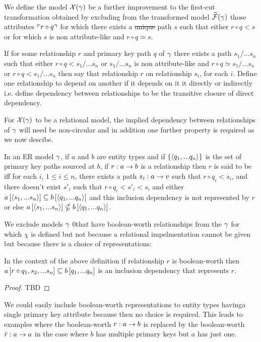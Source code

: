 We define the model $\mathcal{X}(\gamma)$  \index[definitions]{$\chi$}  be a further improvement to the first-cut transformation obtained by excluding  from  the transformed model $\mathcal{\widetilde{F}}(\gamma)$ those attributes $\left\ulcorner r \circ q\right\urcorner$ for which there exists a \sout{unique}  path $s$ such that  either  $r \circ q < s$ or for which $s$ is non attribute-like and $r \circ q \simeq s$. 

\begin{definition}
If for some relationship $r$ and primary key path $q$ of $\gamma$ there exists a  path $s_1/...s_n$ such that either   $r \circ q < s_1/...s_n$ or $s_1/...s_n$ is non attribute-like and $r \circ q \simeq s_1/...s_n$ or $r \circ q < s_1/...s_n$ then say that relationship $r$  on relationship $s_i$,
for each $i$. Define one relationship to depend on another if it depends on it it directly or indirectly i.e. define dependency between relationships to be the transitive closure of direct dependency.
\end{definition}

For $\mathcal{X}(\gamma)$ to be a relational model, the implied dependency between relationships of $\gamma$ will need be non-circular
and in addition one further property is required as we now descibe.


\begin{definition}
In an  ER model $\gamma$, if $a$ and $b$ are entity types and if $\left\{\langle q_1,...q_n\rangle\right\}$ is the set of primary key paths sourced at $b$, if $r: a \rightarrow b$ is a relationship then $r$ is said to be  
iff for each $i$, $1 \leq i \leq n$, there exists a path $s_i: a \rightarrow v$ such that $r \circ q_i < s_i$,
and there doesn't exist $s'_i$ such that $r \circ q_i < s'_i <s_i$ and  either
$a\left[\langle s_1,...s_n\rangle\right]\subseteq b\left[\langle q_1,...q_n\rangle\right]$ and this inclusion dependency is not represented by
$r$ or else $a\left[\langle s_1,...s_n\rangle\right]\nsubseteq b\left[\langle q_1,...q_n\rangle\right]$.
\end{definition}

We exclude models $\gamma$ 0that have boolean-worth relationships from the $\gamma$ for which $\chi$ is defined but not because a relational impelmentation cannot be given but because there is a choice of representations: 
\begin{lemma}
In the context of the above definition if relationship $r$ is boolean-worth
then $a\left[r \circ q_1,s_2,...s_n\right]\subseteq b\left[q_1,...q_n\right]$ is an inclusion dependency that represents $r$. 
\end{lemma}
\begin{proof}
TBD
\end{proof}
We could easily include boolean-worth representations to entity types havinga single primary key attribute because then no choice is required.
This leads to examples where the boolean-worth $r: a \rightarrow b$ is replaced by the boolean-worth $\bar{r}: a \rightarrow a$ in the case where $b$ has multiple primary keys but $a$ has just one.  

